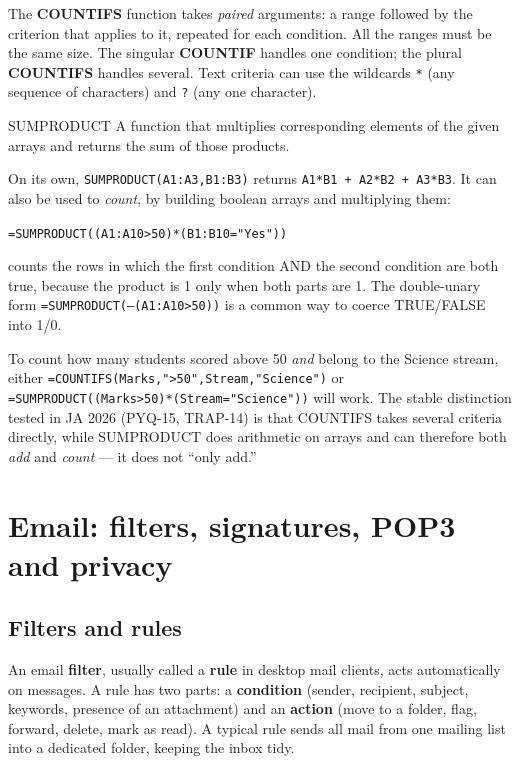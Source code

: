 The \textbf{COUNTIFS} function takes \emph{paired} arguments: a range followed
by the criterion that applies to it, repeated for each condition. All the
ranges must be the same size. The singular \textbf{COUNTIF} handles one
condition; the plural \textbf{COUNTIFS} handles several. Text criteria can use
the wildcards \texttt{*} (any sequence of characters) and \texttt{?} (any one
character).

\begin{definitionbox}{SUMPRODUCT}
A function that multiplies corresponding elements of the given arrays and
returns the sum of those products.
\end{definitionbox}

On its own, \texttt{SUMPRODUCT(A1:A3,B1:B3)} returns
\texttt{A1*B1 + A2*B2 + A3*B3}. It can also be used to \emph{count}, by
building boolean arrays and multiplying them:

\begin{center}
\texttt{=SUMPRODUCT((A1:A10>50)*(B1:B10="Yes"))}
\end{center}

\noindent counts the rows in which the first condition AND the second
condition are both true, because the product is 1 only when both parts are 1.
The double-unary form \texttt{=SUMPRODUCT(--(A1:A10>50))} is a common way to
coerce TRUE/FALSE into 1/0.

\begin{example}
To count how many students scored above 50 \emph{and} belong to the Science
stream, either
\texttt{=COUNTIFS(Marks,">50",Stream,"Science")} or
\texttt{=SUMPRODUCT((Marks>50)*(Stream="Science"))} will work. The stable
distinction tested in JA 2026 (PYQ-15, TRAP-14) is that COUNTIFS takes several
criteria directly, while SUMPRODUCT does arithmetic on arrays and can
therefore both \emph{add} and \emph{count} --- it does not ``only add.''
\end{example}

\section{Email: filters, signatures, POP3 and privacy}
\subsection*{Filters and rules}
An email \textbf{filter}, usually called a \textbf{rule} in desktop mail
clients, acts automatically on messages. A rule has two parts: a
\textbf{condition} (sender, recipient, subject, keywords, presence of an
attachment) and an \textbf{action} (move to a folder, flag, forward, delete,
mark as read). A typical rule sends all mail from one mailing list into a
dedicated folder, keeping the inbox tidy.

